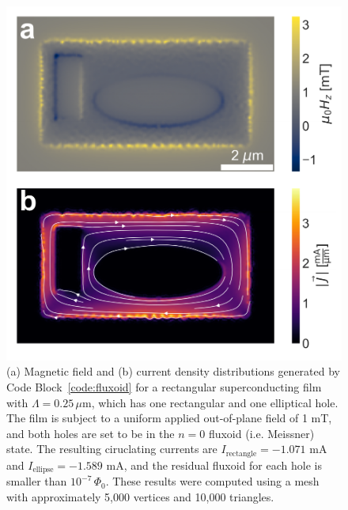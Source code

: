 \documentclass[final,3p,times,twocolumn]{elsarticle}
\newcommand{\um}{\mu\mathrm{m}}
\begin{document}
\begin{figure}[t]
    \centering
    \includegraphics[width=\linewidth]{examples/images/fluxoid.pdf}
    \caption{(a) Magnetic field and (b) current density distributions generated by Code Block~\ref{code:fluxoid} for a rectangular superconducting film with $\Lambda=0.25\,\um$, which has one rectangular and one elliptical hole. The film is subject to a uniform applied out-of-plane field of 1 mT, and both holes are set to be in the $n=0$ fluxoid (i.e. Meissner) state. The resulting ciruclating currents are $I_\text{rectangle} = -1.071$ mA and $I_\text{ellipse} = -1.589$ mA, and the residual fluxoid for each hole is smaller than $10^{-7}\,\Phi_0$. These results were computed using a mesh with approximately 5,000 vertices and 10,000 triangles.}
    \label{fig:fluxoid}
\end{figure}
\end{document}
